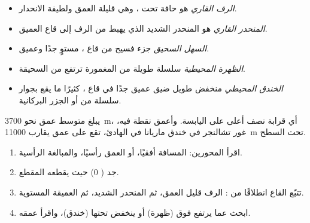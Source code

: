 \begin{definition}\label{def:g8:the-oceans:seafloor}
\begin{itemize}
  \item \emph{الرف القاري} هو حافة  تحت ،
        وهي قليلة العمق ولطيفة الانحدار.
  \item \emph{المنحدر القاري} هو المنحدر الشديد الذي
        يهبط من الرف إلى قاع  العميق.
  \item \emph{السهل السحيق} جزء فسيح من قاع ، مستوٍ
        جدًا وعميق.
  \item \emph{الظهرة المحيطية} سلسلة طويلة من
         المغمورة ترتفع من  السحيقة.
  \item \emph{الخندق المحيطي} منخفض طويل ضيق
        عميق جدًا في قاع ، كثيرًا ما يقع بجوار سلسلة من
         أو الجزر البركانية.
\end{itemize}
\end{definition}

يبلغ متوسط عمق  نحو \qty{3700}{m}، أي قرابة نصف  أعلى  على
اليابسة. وأعمق نقطة فيه، غور تشالنجر في خندق ماريانا في  الهادئ،
تقع على عمق يقارب \qty{11000}{m} تحت
السطح.


\begin{method}
\begin{enumerate}
  \item اقرأ المحورين: المسافة أفقيًا،  أو العمق رأسيًا،
        والمبالغة الرأسية.
  \item جد  ( 0)  حيث يقطعه
        المقطع.
  \item تتبّع القاع انطلاقًا من : الرف قليل العمق، ثم المنحدر الشديد،
        ثم  العميقة المستوية.
  \item ابحث عما يرتفع فوق  (ظهرة) أو ينخفض تحتها
        (خندق)، واقرأ عمقه.
\end{enumerate}
\end{method}

